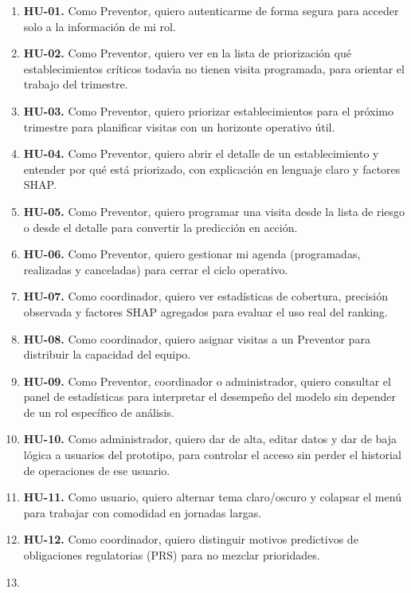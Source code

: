 \begin{enumerate}
	\item \textbf{HU-01.} Como Preventor, quiero autenticarme de forma segura para acceder solo a la informaci\'on de mi rol.
	\item \textbf{HU-02.} Como Preventor, quiero ver en la lista de priorizaci\'on qu\'e establecimientos cr\'iticos todav\'{\i}a no tienen visita programada, para orientar el trabajo del trimestre.
	\item \textbf{HU-03.} Como Preventor, quiero priorizar establecimientos para el pr\'oximo trimestre para planificar visitas con un horizonte operativo \'util.
	\item \textbf{HU-04.} Como Preventor, quiero abrir el detalle de un establecimiento y entender por qu\'e est\'a priorizado, con explicaci\'on en lenguaje claro y factores SHAP.
	\item \textbf{HU-05.} Como Preventor, quiero programar una visita desde la lista de riesgo o desde el detalle para convertir la predicci\'on en acci\'on.
	\item \textbf{HU-06.} Como Preventor, quiero gestionar mi agenda (programadas, realizadas y canceladas) para cerrar el ciclo operativo.
	\item \textbf{HU-07.} Como coordinador, quiero ver estad\'isticas de cobertura, precisi\'on observada y factores SHAP agregados para evaluar el uso real del ranking.
	\item \textbf{HU-08.} Como coordinador, quiero asignar visitas a un Preventor para distribuir la capacidad del equipo.
	\item \textbf{HU-09.} Como Preventor, coordinador o administrador, quiero consultar el panel de estad\'isticas para interpretar el desempe\~no del modelo sin depender de un rol espec\'ifico de an\'alisis.
	\item \textbf{HU-10.} Como administrador, quiero dar de alta, editar datos y dar de baja l\'ogica a usuarios del prototipo, para controlar el acceso sin perder el historial de operaciones de ese usuario.
	\item \textbf{HU-11.} Como usuario, quiero alternar tema claro/oscuro y colapsar el men\'u para trabajar con comodidad en jornadas largas.
	\item \textbf{HU-12.} Como coordinador, quiero distinguir motivos predictivos de obligaciones regulatorias (PRS) para no mezclar prioridades.
	\item {}

\end{enumerate}
